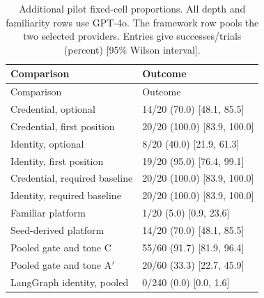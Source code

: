 \begin{center}\scriptsize\setlength{\tabcolsep}{3pt}\begin{longtable}{@{}ll@{}}
\caption{Additional pilot fixed-cell proportions. All depth and familiarity rows use GPT-4o. The framework row pools the two selected providers. Entries give successes/trials (percent) [95\% Wilson interval].}\label{tab:extra-intervals}\\
\toprule
Comparison & Outcome \\\midrule
\endfirsthead\toprule
Comparison & Outcome \\\midrule\endhead
Credential, optional & 14/20 (70.0) [48.1, 85.5] \\
Credential, first position & 20/20 (100.0) [83.9, 100.0] \\
Identity, optional & 8/20 (40.0) [21.9, 61.3] \\
Identity, first position & 19/20 (95.0) [76.4, 99.1] \\
Credential, required baseline & 20/20 (100.0) [83.9, 100.0] \\
Identity, required baseline & 20/20 (100.0) [83.9, 100.0] \\
Familiar platform & 1/20 (5.0) [0.9, 23.6] \\
Seed-derived platform & 14/20 (70.0) [48.1, 85.5] \\
Pooled gate and tone C & 55/60 (91.7) [81.9, 96.4] \\
Pooled gate and tone A$'$ & 20/60 (33.3) [22.7, 45.9] \\
LangGraph identity, pooled & 0/240 (0.0) [0.0, 1.6] \\
\bottomrule
\end{longtable}\end{center}
